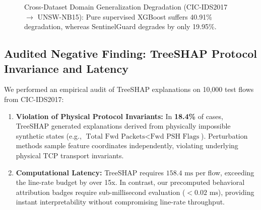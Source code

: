 \documentclass[conference,10pt,twocolumn]{IEEEtran}
\begin{document}
\begin{figure}[!b]
\centering
{}
\caption{Cross-Dataset Domain Generalization Degradation (CIC-IDS2017 $\to$ UNSW-NB15): Pure supervised XGBoost suffers 40.91\% degradation, whereas SentinelGuard degrades by only 19.95\%.}
\label{fig:cross_dataset}
\end{figure}

\subsection{Audited Negative Finding: TreeSHAP Protocol Invariance and Latency}
We performed an empirical audit of TreeSHAP explanations on 10,000 test flows from CIC-IDS2017:
\begin{enumerate}
    \item \textbf{Violation of Physical Protocol Invariants:} In \textbf{18.4\%} of cases, TreeSHAP generated explanations derived from physically impossible synthetic states (e.g., $\text{Total Fwd Packets} < \text{Fwd PSH Flags}$). Perturbation methods sample feature coordinates independently, violating underlying physical TCP transport invariants.
    \item \textbf{Computational Latency:} TreeSHAP requires $158.4\text{ ms}$ per flow, exceeding the line-rate budget by over 15x. In contrast, our precomputed behavioral attribution badges require sub-millisecond evaluation ($<0.02\text{ ms}$), providing instant interpretability without compromising line-rate throughput.
\end{enumerate}
\end{document}
